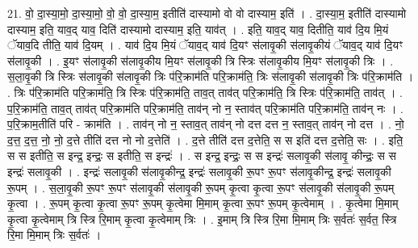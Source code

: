\documentclass[17pt]{extarticle}
\begin{document}
21. वो॒ दा॒स्या॒मो॒ दा॒स्या॒मो॒ वो॒ वो॒ दा॒स्या॒म॒ इतीति॑ दास्यामो वो वो दास्याम॒ इति॑ । . दा॒स्या॒म॒ इतीति॑ दास्यामो दास्याम॒ इति॒ याव॒द् याव॒ दिति॑ दास्यामो दास्याम॒ इति॒ याव॑त् । . इति॒ याव॒द् याव॒ दितीति॒ याव॑ दि॒य मि॒यं ॅयाव॒दि तीति॒ याव॑ दि॒यम् । . याव॑ दि॒य मि॒यं ॅयाव॒द् याव॑ दि॒यꣳ स॑लावृ॒की स॑लावृ॒कीयं ॅयाव॒द् याव॑ दि॒यꣳ स॑लावृ॒की । . इ॒यꣳ स॑लावृ॒की स॑लावृ॒कीय मि॒यꣳ स॑लावृ॒की त्रि स्त्रिः स॑लावृ॒कीय मि॒यꣳ स॑लावृ॒की त्रिः । . स॒ला॒वृ॒की त्रि स्त्रिः स॑लावृ॒की स॑लावृ॒की त्रिः प॑रि॒क्राम॑ति परि॒क्राम॑ति॒ त्रिः स॑लावृ॒की स॑लावृ॒की त्रिः प॑रि॒क्राम॑ति । . त्रिः प॑रि॒क्राम॑ति परि॒क्राम॑ति॒ त्रि स्त्रिः प॑रि॒क्राम॑ति॒ ताव॒त् ताव॑त् परि॒क्राम॑ति॒ त्रि स्त्रिः प॑रि॒क्राम॑ति॒ ताव॑त् । . प॒रि॒क्राम॑ति॒ ताव॒त् ताव॑त् परि॒क्राम॑ति परि॒क्राम॑ति॒ ताव॑न् नो न॒ स्ताव॑त् परि॒क्राम॑ति परि॒क्राम॑ति॒ ताव॑न् नः । . प॒रि॒क्राम॒तीति॑ परि - क्राम॑ति । . ताव॑न् नो न॒ स्ताव॒त् ताव॑न् नो दत्त दत्त न॒ स्ताव॒त् ताव॑न् नो दत्त । . नो॒ द॒त्त॒ द॒त्त॒ नो॒ नो॒ द॒त्ते तीति॑ दत्त नो नो द॒त्तेति॑ । . द॒त्ते तीति॑ दत्त द॒त्तेति॒ स स इति॑ दत्त द॒त्तेति॒ सः । . इति॒ स स इतीति॒ स इन्द्र॒ इन्द्रः॒ स इतीति॒ स इन्द्रः॑ । . स इन्द्र॒ इन्द्रः॒ स स इन्द्रः॑ सलावृ॒की स॑लावृ॒ कीन्द्रः॒ स स इन्द्रः॑ सलावृ॒की । . इन्द्रः॑ सलावृ॒की स॑लावृ॒कीन्द्र॒ इन्द्रः॑ सलावृ॒की रू॒पꣳ रू॒पꣳ स॑लावृ॒कीन्द्र॒ इन्द्रः॑ सलावृ॒की रू॒पम् । . स॒ला॒वृ॒की रू॒पꣳ रू॒पꣳ स॑लावृ॒की स॑लावृ॒की रू॒पम् कृ॒त्वा कृ॒त्वा रू॒पꣳ स॑लावृ॒की स॑लावृ॒की रू॒पम् कृ॒त्वा । . रू॒पम् कृ॒त्वा कृ॒त्वा रू॒पꣳ रू॒पम् कृ॒त्वेमा मि॒माम् कृ॒त्वा रू॒पꣳ रू॒पम् कृ॒त्वेमाम् । . कृ॒त्वेमा मि॒माम् कृ॒त्वा कृ॒त्वेमाम् त्रि स्त्रि रि॒माम् कृ॒त्वा कृ॒त्वेमाम् त्रिः । . इ॒माम् त्रि स्त्रि रि॒मा मि॒माम् त्रिः स॒र्वतः॑ स॒र्वत॒ स्त्रि रि॒मा मि॒माम् त्रिः स॒र्वतः॑ । \newline
\end{document}
